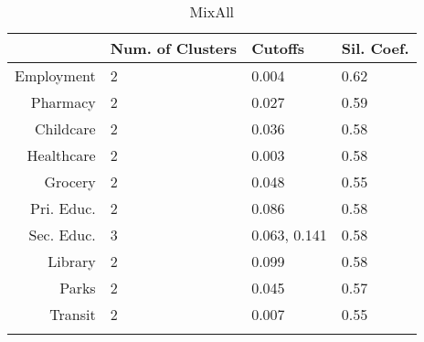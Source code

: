 \documentclass[10pt, a4paper]{article}
\begin{document}
 \pagebreak 
 
\begin{longtable}{rlll}
  \hline
 & Num. of Clusters & Cutoffs & Sil. Coef. \\ 
  \hline
Employment & 2 & 0.004 & 0.62 \\ 
   \hline
Pharmacy & 2 & 0.027 & 0.59 \\ 
   \hline
Childcare & 2 & 0.036 & 0.58 \\ 
   \hline
Healthcare & 2 & 0.003 & 0.58 \\ 
   \hline
Grocery & 2 & 0.048 & 0.55 \\ 
   \hline
Pri. Educ. & 2 & 0.086 & 0.58 \\ 
   \hline
Sec. Educ. & 3 & 0.063, 0.141 & 0.58 \\ 
   \hline
Library & 2 & 0.099 & 0.58 \\ 
   \hline
Parks & 2 & 0.045 & 0.57 \\ 
   \hline
Transit & 2 & 0.007 & 0.55 \\ 
   \hline
\hline
\caption{MixAll} 
\end{longtable}





 \pagebreak 
 




 
\end{document}

